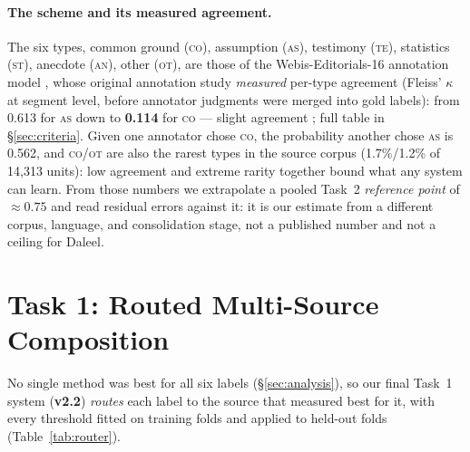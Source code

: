 \documentclass[11pt]{article}
\newcommand{\lab}[1]{\textsc{#1}}
\newcommand{\co}{\lab{co}}
\newcommand{\as}{\lab{as}}
\newcommand{\te}{\lab{te}}
\newcommand{\st}{\lab{st}}
\newcommand{\an}{\lab{an}}
\newcommand{\ot}{\lab{ot}}
\begin{document}
\paragraph{The scheme and its measured agreement.} The six types, common
ground (\co), assumption (\as), testimony (\te), statistics (\st),
anecdote (\an), other (\ot), are those of the Webis-Editorials-16
annotation model \citep{alkhatib-etal-2016-news}, whose original
annotation study \emph{measured} per-type agreement (Fleiss' $\kappa$ at
segment level, before annotator judgments were merged into gold labels):
from 0.613 for \as{} down to \textbf{0.114} for \co{} --- slight
agreement \citep{landis-koch-1977-measurement,fleiss-1971-measuring};
full table in \S\ref{sec:criteria}. Given one annotator chose \co, the probability
another chose \as{} is 0.562, and \co/\ot{} are also the rarest types in
the source corpus (1.7\%/1.2\% of 14{,}313 units): low agreement and
extreme rarity together bound what any system can learn. From those
numbers we extrapolate a pooled Task~2 \emph{reference point} of
${\approx}0.75$ and read residual errors against it: it is our estimate
from a different corpus, language, and consolidation stage, not a
published number and not a ceiling for Daleel.

\section{Task 1: Routed Multi-Source Composition}
\label{sec:t1}

No single method was best for all six labels
(\S\ref{sec:analysis}), so our final Task~1 system
(\textbf{v2.2}) \emph{routes} each label to the source that
measured best for it, with every threshold fitted on training folds and
applied to held-out folds (Table~\ref{tab:router}).
\end{document}
